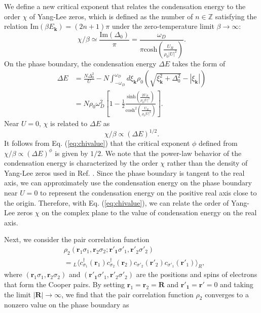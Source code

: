 \documentclass[aps,prl,twocolumn,nofootinbib,superscriptaddress,longbibliography]{revtex4-1}
\begin{document}
	We define a new critical exponent that relates the condensation energy to the order $\chi$ of Yang-Lee zeros,
	which is defined as the number of $n\in\mathbb{Z}$ satisfying the relation
	$\mathrm{Im}(\beta E_{\bm{k}})=(2n+1)\pi$ under the zero-temperature limit $\beta\to\infty$:
	\begin{equation}
	\chi/\beta\simeq\frac{\text{Im}(\Delta_{0})}{\pi}=\frac{\omega_{D}}{\pi\text{cosh}(\frac{U_{R}}{\rho_{0}|U|^{2}})}.
	\end{equation}
	  On the phase boundary, the condensation energy $\Delta E$ takes the form of
	 \begin{align}
	 \Delta E&=  \frac{N\Delta_0^2}{U}
	 - N \int_{- \omega_D}^{\omega_D} d \xi_{\bm{k}} \rho_0 \left( \sqrt{\xi_{\bm{k}}^2 +
	 	\Delta_0^2} - | \xi_{\bm{k}} | \right)\nonumber\\
	 &=N \rho_0 \omega_D^2 \left[ 1 - \frac{1}{2} \frac{\text{sinh} \left(\frac{2 U_R}{\rho_0 | U |^2} \right)}{\text{cosh}^2 \left( \frac{U_R}{\rho_0| U |^2} \right)} \right].
	 \end{align}
	 Near $U=0$, $\chi$ is related to $\Delta E$ as
	\begin{equation}
	\chi/\beta\propto(\Delta E)^{1/2}.
	\label{eq:chivalue}
	\end{equation}
	 It follows from Eq. (\ref{eq:chivalue}) that the critical exponent $\phi$ defined from $\chi/\beta\propto(\Delta E)^{\phi}$ is given by $1/2$. We note that the power-law behavior of the condensation energy is characterized by the order $\chi$ rather than the density of Yang-Lee zeros used in Ref. \cite{Fisher:1978vn}. Since the phase boundary is tangent to the real axis, we can approximately use the condensation energy on the phase boundary near $U=0$ to represent the condensation energy on the positive real axis close to the origin. Therefore, with Eq. (\ref{eq:chivalue}), we can relate the order of Yang-Lee zeros $\chi$ on the complex plane to the value of condensation energy on the real axis. 
	
	Next, we consider the pair correlation function
	\begin{align}
	&\rho_{2}(\bm{r}_{1}\sigma_{1},\bm{r}_{2}\sigma_{2};\bm{r'_{1}}\sigma'_{1},\bm{r'}_{2}\sigma'_{2})\nonumber\\
	&={}_{L}\langle c_{\sigma_{1}}^{\dagger}(\bm{r}_{1})c_{\sigma_{2}}^{\dagger}(\bm{r}_{2})c_{\sigma'_{2}}(\bm{r'}_{2})c_{\sigma'_{1}}(\bm{r'}_{1})\rangle_{R},
	\end{align}
	where $(\bm{r}_{1}\sigma_{1},\bm{r}_{2}\sigma_{2})$ and $(\bm{r'_{1}}\sigma'_{1},\bm{r'}_{2}\sigma'_{2})$ are the positions and spins of electrons that form the Cooper pairs. By setting
	$\bm{r}_{1}=\bm{r}_{2}=\bm{R}$ and $\bm{r'_{1}}=\bm{r'}=0$ and taking
	the limit $|\bm{R}|\rightarrow\infty$, we find that the pair correlation function
	$\rho_2$ converges to a nonzero value on the phase boundary as
	
\end{document}
